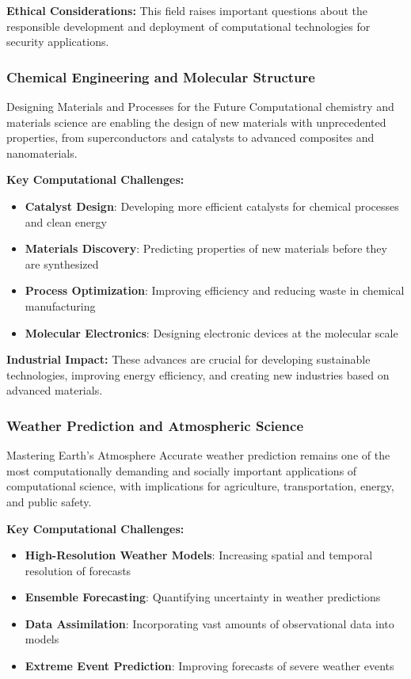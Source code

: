 \textbf{Ethical Considerations:}
This field raises important questions about the responsible development and deployment of computational technologies for security applications.

\subsubsection{Chemical Engineering and Molecular Structure}

\begin{highlightbox}{Designing Materials and Processes for the Future}
Computational chemistry and materials science are enabling the design of new materials with unprecedented properties, from superconductors and catalysts to advanced composites and nanomaterials.
\end{highlightbox}

\textbf{Key Computational Challenges:}
\begin{itemize}
    \item \textbf{Catalyst Design}: Developing more efficient catalysts for chemical processes and clean energy
    \item \textbf{Materials Discovery}: Predicting properties of new materials before they are synthesized
    \item \textbf{Process Optimization}: Improving efficiency and reducing waste in chemical manufacturing
    \item \textbf{Molecular Electronics}: Designing electronic devices at the molecular scale
\end{itemize}

\textbf{Industrial Impact:}
These advances are crucial for developing sustainable technologies, improving energy efficiency, and creating new industries based on advanced materials.

\subsubsection{Weather Prediction and Atmospheric Science}

\begin{highlightbox}{Mastering Earth's Atmosphere}
Accurate weather prediction remains one of the most computationally demanding and socially important applications of computational science, with implications for agriculture, transportation, energy, and public safety.
\end{highlightbox}

\textbf{Key Computational Challenges:}
\begin{itemize}
    \item \textbf{High-Resolution Weather Models}: Increasing spatial and temporal resolution of forecasts
    \item \textbf{Ensemble Forecasting}: Quantifying uncertainty in weather predictions
    \item \textbf{Data Assimilation}: Incorporating vast amounts of observational data into models
    \item \textbf{Extreme Event Prediction}: Improving forecasts of severe weather events
\end{itemize}

